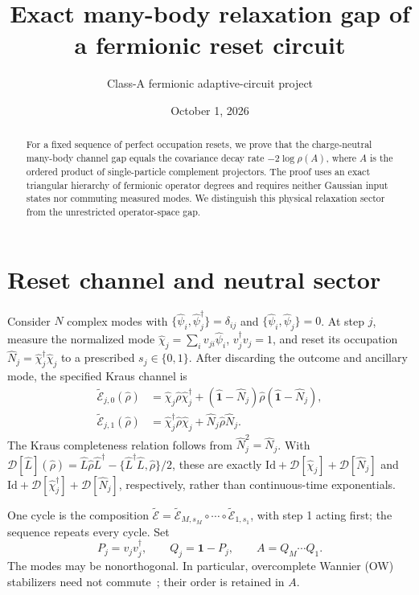 \documentclass[aps,prb,twocolumn,10pt,nofootinbib,superscriptaddress]{revtex4-2}
\newcommand{\Id}{\hat{\mathbf{1}}}
\newcommand{\id}{\mathbf{1}}
\newcommand{\E}{\widetilde{\mathcal E}}
\begin{document}
\title{Exact many-body relaxation gap of a fermionic reset circuit}
\author{Class-A fermionic adaptive-circuit project}
\noaffiliation
\date{October 1, 2026}
\begin{abstract}
For a fixed sequence of perfect occupation resets, we prove that the
charge-neutral many-body channel gap equals the covariance decay rate
$-2\log\rho(A)$, where $A$ is the ordered product of single-particle
complement projectors. The proof uses an exact triangular hierarchy of
fermionic operator degrees and requires neither Gaussian input states nor
commuting measured modes. We distinguish this physical relaxation sector
from the unrestricted operator-space gap.
\end{abstract}
\maketitle
\setcounter{tocdepth}{1}
\tableofcontents

\section{Reset channel and neutral sector}
Consider $N$ complex modes with
$\{\hat\psi_i,\hat\psi_j^\dagger\}=\delta_{ij}$ and
$\{\hat\psi_i,\hat\psi_j\}=0$. At step $j$, measure the normalized mode
$\hat\chi_j=\sum_i v_{ji}\hat\psi_i$, $v_j^\dagger v_j=1$, and reset its
occupation $\hat N_j=\hat\chi_j^\dagger\hat\chi_j$ to a prescribed
$s_j\in\{0,1\}$. After discarding the outcome and ancillary mode, the
specified Kraus channel is
\begin{align}
 \E_{j,0}(\hat\rho)&=\hat\chi_j\hat\rho\hat\chi_j^\dagger
 +(\Id-\hat N_j)\hat\rho(\Id-\hat N_j),\nonumber\\
 \E_{j,1}(\hat\rho)&=\hat\chi_j^\dagger\hat\rho\hat\chi_j
 +\hat N_j\hat\rho\hat N_j. \label{eq:reset}
\end{align}
The Kraus completeness relation follows from $\hat N_j^2=\hat N_j$.
With $\mathcal D[\hat L](\hat\rho)=\hat L\hat\rho\hat L^\dagger
-\{\hat L^\dagger\hat L,\hat\rho\}/2$, these are exactly
$\mathrm{Id}+\mathcal D[\hat\chi_j]+\mathcal D[\hat N_j]$ and
$\mathrm{Id}+\mathcal D[\hat\chi_j^\dagger]+\mathcal D[\hat N_j]$,
respectively, rather than continuous-time exponentials.

One cycle is the composition
$\E=\E_{M,s_M}\circ\cdots\circ\E_{1,s_1}$, with step 1 acting first;
the sequence repeats every cycle. Set
\begin{equation}
 P_j=v_jv_j^\dagger,\qquad Q_j=\id-P_j,\qquad
 A=Q_M\cdots Q_1. \label{eq:A}
\end{equation}
The modes may be nonorthogonal. In particular, overcomplete Wannier (OW)
stabilizers need not commute~\cite{BPJ}; their order is retained in $A$.
\end{document}
